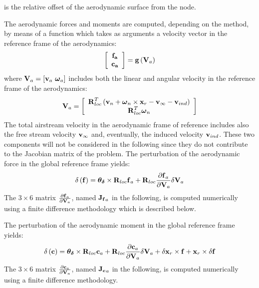 is the relative offset of the aerodynamic surface from the node.

The aerodynamic forces and moments are computed, depending on the method, 
by means of a function which takes as arguments a velocity vector
in the reference frame of the aerodynamics:
\begin{equation}
	\sqbr{\matr{c}{\T{f_a}\\\T{c_a}}} = \T{g}\plbr{\T{V}_{a}}
\end{equation}
where $\T{V}_{a} = \sqbr{\T{v}_a\ \T{\omega}_a}$ includes both the 
linear and angular velocity in the reference frame of the aerodynamics:
\begin{equation}
	\T{V}_{a} = \sqbr{\matr{c}{
		\T{R}^T_{loc} \plbr{\T{v}_n + \T{\omega}_n\times\T{x}_r - \T{v}_{\infty} - \T{v}_{ind}}\\
		\T{R}^T_{loc} \T{\omega}_n
		}}
\end{equation}
The total airstream velocity in the aerodynamic frame of reference 
includes also the free stream velocity $\T{v}_{\infty}$ and, eventually, 
the induced velocity $\T{v}_{ind}$. These two components will not be 
considered in the following since they do not contribute to the 
Jacobian matrix of the problem. 
The perturbation of the aerodynamic force in the global reference frame
yields:
\begin{equation}
	\delta\plbr{\T{f}} = \T{\theta_{\delta}}\times\T{R}_{loc}\T{f}_a + 
				\T{R}_{loc}\frac{\partial\T{f}_a}{\partial\T{V}_a}
				\delta\T{V}_a
\end{equation}
The $3\times6$ matrix $\frac{\partial\T{f}_a}{\partial\T{V}_a}$, 
named $\T{J_f}_a$ in the
following, is computed numerically using a finite difference methodology
which is described below.

The perturbation of the aerodynamic moment in the global reference frame
yields:
\begin{equation}
	\delta\plbr{\T{c}} = \T{\theta_{\delta}}\times\T{R}_{loc}\T{c}_a + 
				\T{R}_{loc}\frac{\partial\T{c}_a}{\partial\T{V}_a}
				\delta\T{V}_a + \delta \T{x}_r\times\T{f} + 
				\T{x}_r\times\delta\T{f}
\end{equation}
The $3\times6$ matrix $\frac{\partial\T{c}_a}{\partial\T{V}_a}$, 
named $\T{J_c}_a$ in the
following, is computed numerically using a finite difference methodology.

